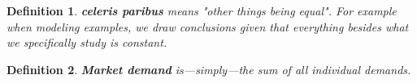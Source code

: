 \documentclass{article}
\newtheorem{definition}{Definition}[section]
\newcommand{\define}[1]{\textbf{\textit{#1}}}
\begin{document}
\begin{definition}
  \define{celeris paribus} means "other things being equal". For example when modeling examples, we draw conclusions given that everything besides what we specifically study is constant. 
\end{definition}

\begin{definition}
  \define{Market demand} is---simply---the sum of all individual demands. 
\end{definition}
\end{document}
